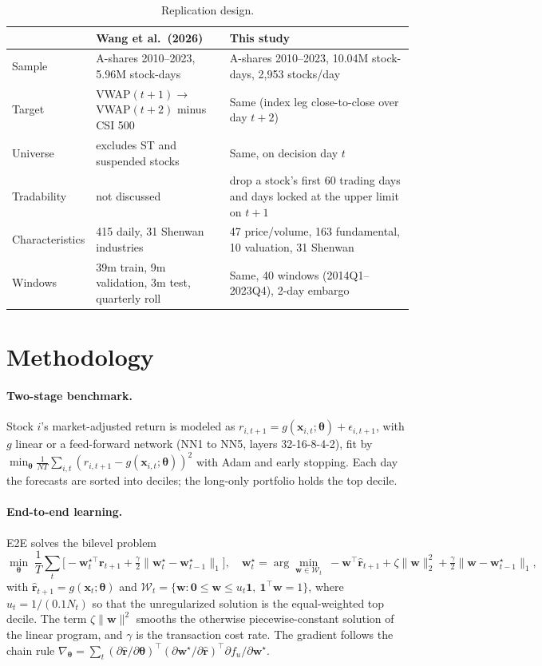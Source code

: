 \documentclass[10pt,a4paper]{article}
\newcommand{\rhat}{\hat{\bm r}}
\newcommand{\w}{\bm w}
\begin{document}
\begin{table}[h]
\centering\small
\caption{Replication design.}\label{tab:setup}
\begin{tabular}{p{2.6cm}p{6.2cm}p{6.6cm}}
\toprule
& Wang et al.\ (2026) & This study \\
\midrule
Sample & A-shares 2010--2023, 5.96M stock-days & A-shares 2010--2023, 10.04M stock-days, 2,953 stocks/day \\
Target & VWAP$(t{+}1)\to$VWAP$(t{+}2)$ minus CSI 500 & Same (index leg close-to-close over day $t{+}2$) \\
Universe & excludes ST and suspended stocks & Same, on decision day $t$ \\
Tradability & not discussed & drop a stock's first 60 trading days and days locked at the upper limit on $t{+}1$ \\
Characteristics & 415 daily, 31 Shenwan industries & 47 price/volume, 163 fundamental, 10 valuation, 31 Shenwan \\
Windows & 39m train, 9m validation, 3m test, quarterly roll & Same, 40 windows (2014Q1--2023Q4), 2-day embargo \\
\bottomrule
\end{tabular}
\end{table}

\section{Methodology}
\paragraph{Two-stage benchmark.} Stock $i$'s market-adjusted return is modeled as $r_{i,t+1}=g(\bm x_{i,t};\bm\theta)
+\epsilon_{i,t+1}$, with $g$ linear or a feed-forward network (NN1 to NN5, layers 32-16-8-4-2), fit by
$\min_{\bm\theta}\frac{1}{NT}\sum_{i,t}(r_{i,t+1}-g(\bm x_{i,t};\bm\theta))^2$ with Adam and early stopping. Each
day the forecasts are sorted into deciles; the long-only portfolio holds the top decile.

\paragraph{End-to-end learning.} E2E solves the bilevel problem
\begin{equation}
\min_{\bm\theta}\;\frac1T\sum_{t}\Big[-\w_t^{\star\top}\bm r_{t+1}+\tfrac{\gamma}{2}\lVert\w_t^\star-\w_{t-1}^\star\rVert_1\Big],
\quad
\w_t^\star=\arg\min_{\w\in\mathcal W_t}\;-\w^\top\rhat_{t+1}+\zeta\lVert\w\rVert_2^2+\tfrac{\gamma}{2}\lVert\w-\w^\star_{t-1}\rVert_1,
\label{eq:bilevel}
\end{equation}
with $\rhat_{t+1}=g(\bm x_t;\bm\theta)$ and $\mathcal W_t=\{\w:\bm 0\le\w\le u_t\bm 1,\ \bm 1^\top\w=1\}$, where
$u_t=1/(0.1N_t)$ so that the unregularized solution is the equal-weighted top decile. The term $\zeta\lVert\w\rVert^2$
smooths the otherwise piecewise-constant solution of the linear program, and $\gamma$ is the transaction cost
rate. The gradient follows the chain rule $\nabla_{\bm\theta}=\sum_t(\partial\rhat/\partial\bm\theta)^\top
(\partial\w^\star/\partial\rhat)^\top\partial f_u/\partial\w^\star$.
\end{document}
